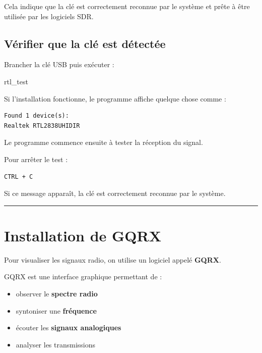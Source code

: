 \documentclass[
  french,
]{article}
\newenvironment{Shaded}{\begin{snugshade}}{\end{snugshade}}
\newcommand{\ExtensionTok}[1]{#1}
\providecommand{\tightlist}{%
  \setlength{\itemsep}{0pt}\setlength{\parskip}{0pt}}
\begin{document}
Cela indique que la clé est correctement reconnue par le système et
prête à être utilisée par les logiciels SDR.

\subsection{Vérifier que la clé est
détectée}\label{vuxe9rifier-que-la-cluxe9-est-duxe9tectuxe9e}

Brancher la clé USB puis exécuter :

\begin{Shaded}
\begin{Highlighting}[]
\ExtensionTok{rtl\_test}
\end{Highlighting}
\end{Shaded}

Si l'installation fonctionne, le programme affiche quelque chose comme :

\begin{verbatim}
Found 1 device(s):
Realtek RTL2838UHIDIR
\end{verbatim}

Le programme commence ensuite à tester la réception du signal.

Pour arrêter le test :

\begin{verbatim}
CTRL + C
\end{verbatim}

Si ce message apparaît, la clé est correctement reconnue par le système.

\begin{center}\rule{0.5\linewidth}{0.5pt}\end{center}

\section{Installation de GQRX}\label{installation-de-gqrx}

Pour visualiser les signaux radio, on utilise un logiciel appelé
\textbf{GQRX}.

GQRX est une interface graphique permettant de :

\begin{itemize}
\tightlist
\item
  observer le \textbf{spectre radio}
\item
  syntoniser une \textbf{fréquence}
\item
  écouter les \textbf{signaux analogiques}
\item
  analyser les transmissions
\end{itemize}
\end{document}
